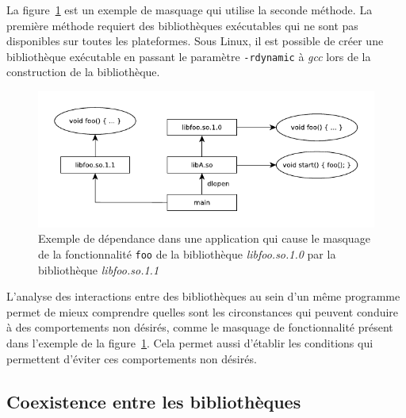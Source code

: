 La figure~\ref{fig:deps-ex2} est un exemple de masquage qui utilise la seconde
méthode. La première méthode requiert des bibliothèques exécutables qui ne sont pas
disponibles sur toutes les plateformes. Sous Linux, il est possible de créer une
bibliothèque exécutable en passant le paramètre \texttt{-rdynamic} à \textit{gcc}
lors de la construction de la bibliothèque.

\begin{figure}[ht]
  \centering
  \includegraphics{figures/libdeps-ex2.pdf}
  \caption{Exemple de dépendance dans une application qui cause le masquage de
  la fonctionnalité \texttt{foo} de la bibliothèque \textit{libfoo.so.1.0} par
  la bibliothèque \textit{libfoo.so.1.1}}
  \label{fig:deps-ex2}
\end{figure}


L'analyse des interactions entre des bibliothèques au sein d'un même programme
permet de mieux comprendre quelles sont les circonstances qui peuvent conduire
à des comportements non désirés, comme le masquage de fonctionnalité présent
dans l'exemple de la figure~\ref{fig:deps-ex2}.  Cela permet aussi d'établir
les conditions qui permettent d'éviter ces comportements non désirés.

\subsection{Coexistence entre les bibliothèques}

